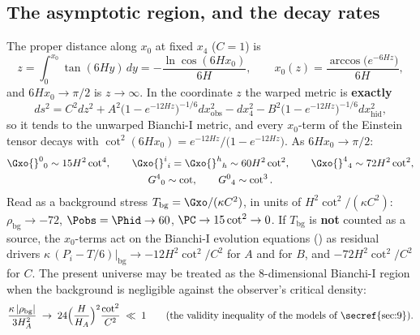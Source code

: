 \subsection{The asymptotic region, and the decay rates}
\label{sec:5.3}

The proper distance along $x_0$ at fixed $x_4$ ($C=1$) is
\[
  z=\int_0^{x_0}\tan(6Hy)\,dy=-\frac{\ln\cos(6Hx_0)}{6H},\qquad x_0(z)=\frac{\arccos\bigl(e^{-6Hz}\bigr)}{6H},
\]
and $6Hx_0\to\pi/2$ is $z\to\infty$. In the coordinate $z$ the warped metric is \textbf{exactly}
\[
  ds^2=C^2dz^2+A^2\bigl(1-e^{-12Hz}\bigr)^{-1/6}dx_{\mathrm{obs}}^2-dx_4^2-B^2\bigl(1-e^{-12Hz}\bigr)^{-1/6}dx_{\mathrm{hid}}^2 ,
\]
so it tends to the unwarped Bianchi-I metric, and every $x_0$-term of the Einstein tensor decays with
$\cot^2(6Hx_0)=e^{-12Hz}/\bigl(1-e^{-12Hz}\bigr)$. As $6Hx_0\to\pi/2$:
\begin{gather*}
  \Gxo{}^0{}_0\sim15H^2\cot^4,\qquad \Gxo{}^i{}_i=\Gxo{}^h{}_h\sim60H^2\cot^2,\qquad \Gxo{}^4{}_4\sim72H^2\cot^2,\\
  G^4{}_0\sim\cot,\qquad G^0{}_4\sim\cot^3 .
\end{gather*}
Read as a background stress $T_{\mathrm{bg}}=\Gxo/(\kappa C^2)$, in units of $H^2\cot^2/(\kappa C^2)$:
$\rho_{\mathrm{bg}}\to-72$, $\Pobs=\Phid\to60$, $\PC\to15\cot^2\to0$. If $T_{\mathrm{bg}}$ is \textbf{not}
counted as a source, the $x_0$-terms act on the Bianchi-I evolution equations () as
residual drivers $\kappa\,(P_i-T/6)\big|_{\mathrm{bg}}\to-12H^2\cot^2/C^2$ for $A$ and for $B$, and
$-72H^2\cot^2/C^2$ for $C$. The present universe may be treated as the 8-dimensional Bianchi-I region
when the background is negligible against the observer's critical density:
\[
  \frac{\kappa\,|\rho_{\mathrm{bg}}|}{3H_A^2}\;\to\;24\Bigl(\frac{H}{H_A}\Bigr)^2\frac{\cot^2}{C^2}\;\ll\;1
  \qquad\text{(the validity inequality of the models of \secref{sec:9})}.
\]
